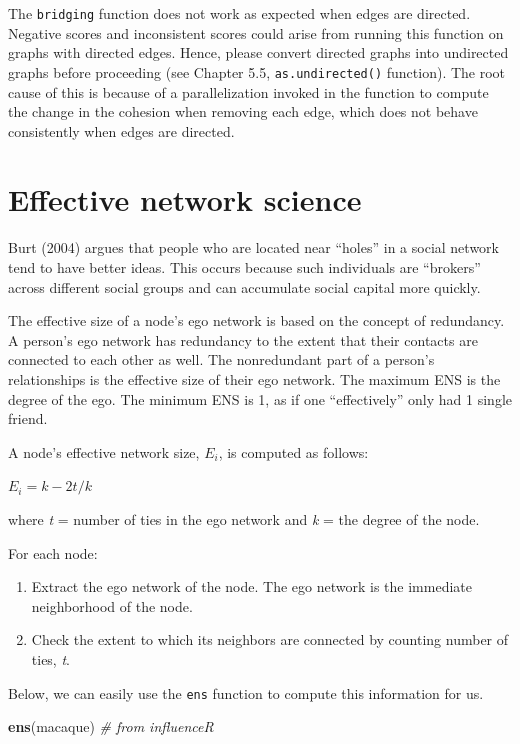 \documentclass[
]{book}
\newenvironment{Shaded}{\begin{snugshade}}{\end{snugshade}}
\newcommand{\CommentTok}[1]{\textcolor[rgb]{0.56,0.35,0.01}{\textit{#1}}}
\newcommand{\FunctionTok}[1]{\textcolor[rgb]{0.13,0.29,0.53}{\textbf{#1}}}
\newcommand{\NormalTok}[1]{#1}
\providecommand{\tightlist}{%
  \setlength{\itemsep}{0pt}\setlength{\parskip}{0pt}}
\begin{document}
The \texttt{bridging} function does not work as expected when edges are directed. Negative scores and inconsistent scores could arise from running this function on graphs with directed edges. Hence, please convert directed graphs into undirected graphs before proceeding (see Chapter 5.5, \texttt{as.undirected()} function). The root cause of this is because of a parallelization invoked in the function to compute the change in the cohesion when removing each edge, which does not behave consistently when edges are directed.

\section{Effective network science}\label{effective-network-science}

Burt (2004) argues that people who are located near ``holes'' in a social network tend to have better ideas. This occurs because such individuals are ``brokers'' across different social groups and can accumulate social capital more quickly.

The effective size of a node's ego network is based on the concept of redundancy. A person's ego network has redundancy to the extent that their contacts are connected to each other as well. The nonredundant part of a person's relationships is the effective size of their ego network. The maximum ENS is the degree of the ego. The minimum ENS is 1, as if one ``effectively'' only had 1 single friend.

A node's effective network size, \(E_i\), is computed as follows:

\(E_i=k−2t/k\)

where \emph{t} = number of ties in the ego network and \emph{k} = the degree of the node.

For each node:

\begin{enumerate}
\def\labelenumi{\arabic{enumi}.}
\tightlist
\item
  Extract the ego network of the node. The ego network is the immediate neighborhood of the node.
\item
  Check the extent to which its neighbors are connected by counting number of ties, \emph{t}.
\end{enumerate}

Below, we can easily use the \texttt{ens} function to compute this information for us.

\begin{Shaded}
\begin{Highlighting}[]
\FunctionTok{ens}\NormalTok{(macaque) }\CommentTok{\# from influenceR}
\end{Highlighting}
\end{Shaded}
\end{document}
